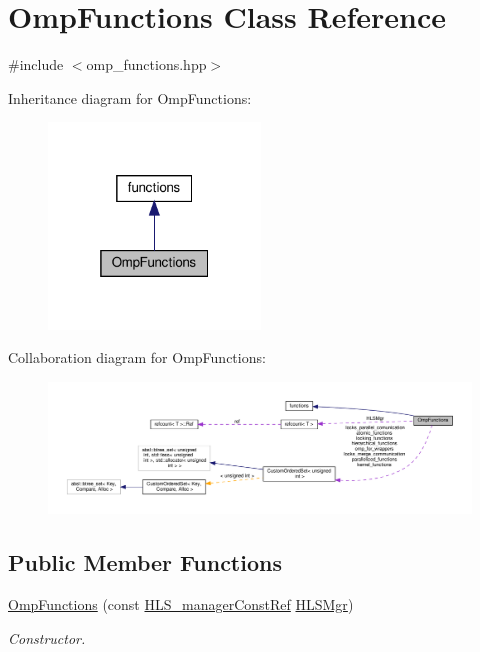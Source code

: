 \hypertarget{classOmpFunctions}{}\section{Omp\+Functions Class Reference}
\label{classOmpFunctions}


{\ttfamily \#include $<$omp\+\_\+functions.\+hpp$>$}



Inheritance diagram for Omp\+Functions\+:
\nopagebreak
\begin{figure}[H]
\begin{center}
\leavevmode
\includegraphics[width=160pt]{d0/d84/classOmpFunctions__inherit__graph}
\end{center}
\end{figure}


Collaboration diagram for Omp\+Functions\+:
\nopagebreak
\begin{figure}[H]
\begin{center}
\leavevmode
\includegraphics[width=350pt]{df/ded/classOmpFunctions__coll__graph}
\end{center}
\end{figure}
\subsection*{Public Member Functions}
\begin{DoxyCompactItemize}
\item 
\hyperlink{classOmpFunctions_af328270d7b437c8e57f08d4fb2a7410f}{Omp\+Functions} (const \hyperlink{hls__manager_8hpp_a1b481383e3beabc89bd7562ae672dd8c}{H\+L\+S\+\_\+manager\+Const\+Ref} \hyperlink{classOmpFunctions_ac4f7ea9ae8c6f4ba3858cdf2cc7ed986}{H\+L\+S\+Mgr})
\begin{DoxyCompactList}\small\item\em Constructor. \end{DoxyCompactList}\end{DoxyCompactItemize}
